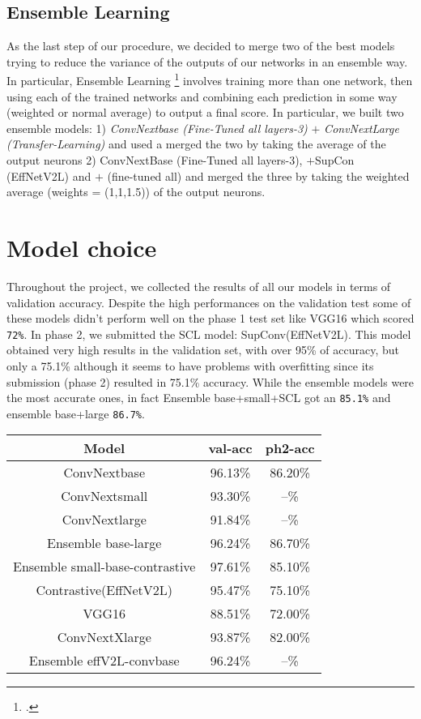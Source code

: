 \documentclass[conference,compsoc,11pt]{IEEEtran}
\begin{document}
\subsection{Ensemble Learning}
As the last step of our procedure, we decided to merge two of the best models  trying to reduce the variance of the outputs of our networks in an ensemble way. In particular, Ensemble Learning \footcite{ensemble} involves training more than one network, then using each of the trained networks and combining each prediction in some way (weighted or normal average) to output a final score. In particular, we built two ensemble models: 1) \textit{ConvNextbase (Fine-Tuned all layers-3)} $+$\textit{ ConvNextLarge (Transfer-Learning)} and used a merged the two by taking the average of the output neurons 2) ConvNextBase (Fine-Tuned all layers-3), $+$SupCon (EffNetV2L) and $+$  (fine-tuned all) and merged the three by taking the weighted average (weights = (1,1,1.5)) of the output neurons.


\section{Model choice}\label{sec:model-choice}
 
Throughout the project, we collected the results of all our models in terms of validation accuracy.
Despite the high performances on the validation test some of these models didn't perform well on the phase 1 test set like VGG16 which scored \verb|72%|. 
In phase 2, we submitted the SCL model:  SupConv(EffNetV2L). This model obtained very high results in the validation set, with over 95\% of  accuracy,  but only a 75.1\%  although it seems to have problems with overfitting since its submission (phase 2) resulted in 75.1\% accuracy. While the ensemble models were the  most accurate ones, in fact Ensemble base+small+SCL got an \verb|85.1%| and ensemble  base+large  \verb|86.7%|.

\begin{center}
\begin{tabular}{||c c c ||} 
 \hline
 Model & val-acc&ph2-acc\\ [0.5ex] 
 \hline\hline
 ConvNextbase & 96.13\%&86.20\%\\ 
 \hline
 ConvNextsmall & 93.30\%&--\%\\
 \hline
 ConvNextlarge & 91.84\%&--\%\\
 \hline
 Ensemble base-large & 96.24\%&86.70\%\\
 \hline
 Ensemble small-base-contrastive & 97.61\%&85.10\%\\
 \hline
 Contrastive(EffNetV2L) & 95.47\%&75.10\%\\
 \hline
 VGG16 & 88.51\%&72.00\%\\
 \hline
 ConvNextXlarge & 93.87\%&82.00\%\\
\hline
Ensemble effV2L-convbase & 96.24\% & --\%\\
\hline
 
\end{tabular}
\end{center}
\end{document}
